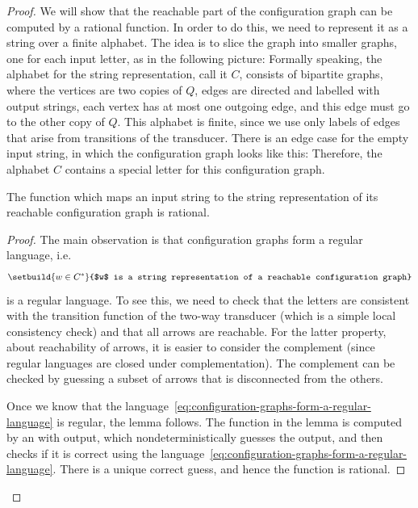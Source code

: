 \begin{proof}
    We will show that the reachable part of the configuration graph can be computed by a rational function. In order to do this, we need to represent it as a string over a finite alphabet. The idea is to slice the graph into smaller graphs, one for each input letter, as in the following picture:
    Formally speaking, the alphabet for the string representation, call it $C$, consists of bipartite  graphs, where the vertices are two copies of $Q$, edges are directed and labelled with output strings, each vertex has at most one outgoing edge, and this edge must go to the other copy of $Q$. This alphabet is finite, since we use only labels of edges that arise from transitions of the transducer. There is an edge case for the empty input string, in which the configuration graph looks like this: 
    Therefore, the alphabet $C$ contains a special letter for this configuration graph. 
    \begin{lemma}\label{lem:compute-configuration-graph}
        The function which maps an input string to the string representation of its reachable configuration graph is rational.
    \end{lemma}
    \begin{proof}
        The main observation is that configuration graphs form a regular language, i.e.~
        \begin{align}
            \label{eq:configuration-graphs-form-a-regular-language}
             \setbuild{w \in C^*}{$w$ is a string representation of a reachable configuration graph}
        \end{align}
        is a regular language. To see this, we need to check that the letters are consistent with the transition function of the two-way transducer (which is a simple local consistency check) and that all arrows are reachable. For the latter property, about reachability of arrows, it is easier to consider the complement (since regular languages are closed under complementation). The complement can be checked by guessing a subset of arrows that is disconnected from the others. 

        Once we know that the language~\eqref{eq:configuration-graphs-form-a-regular-language} is regular, the lemma follows. The function in the lemma is computed by an \nfa with output, which nondeterministically guesses the output, and then checks if it is correct using the language~\eqref{eq:configuration-graphs-form-a-regular-language}. There is a unique correct guess, and hence the function is rational.
    \end{proof}


\end{proof}
